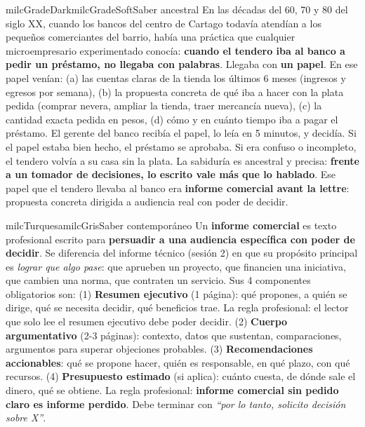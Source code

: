 \documentclass[11pt,letterpaper]{article}
\begin{document}
\begin{softbox}{milcGradeDark}{milcGradeSoft}{Saber ancestral}
En las décadas del 60, 70 y 80 del siglo XX, cuando los bancos del centro de Cartago todavía atendían a los pequeños comerciantes del barrio, había una práctica que cualquier microempresario experimentado conocía: \textbf{cuando el tendero iba al banco a pedir un préstamo, no llegaba con palabras}. Llegaba con \textbf{un papel}. En ese papel venían: (a) las cuentas claras de la tienda los últimos 6 meses (ingresos y egresos por semana), (b) la propuesta concreta de qué iba a hacer con la plata pedida (comprar nevera, ampliar la tienda, traer mercancía nueva), (c) la cantidad exacta pedida en pesos, (d) cómo y en cuánto tiempo iba a pagar el préstamo. El gerente del banco recibía el papel, lo leía en 5 minutos, y decidía. Si el papel estaba bien hecho, el préstamo se aprobaba. Si era confuso o incompleto, el tendero volvía a su casa sin la plata. La sabiduría es ancestral y precisa: \textbf{frente a un tomador de decisiones, lo escrito vale más que lo hablado}. Ese papel que el tendero llevaba al banco era \textbf{informe comercial avant la lettre}: propuesta concreta dirigida a audiencia real con poder de decidir.
\end{softbox}

\begin{softbox}{milcTurquesa}{milcGris}{Saber contemporáneo}
Un \textbf{informe comercial} es texto profesional escrito para \textbf{persuadir a una audiencia específica con poder de decidir}. Se diferencia del informe técnico (sesión 2) en que su propósito principal es \emph{lograr que algo pase}: que aprueben un proyecto, que financien una iniciativa, que cambien una norma, que contraten un servicio. Sus 4 componentes obligatorios son: (1) \textbf{Resumen ejecutivo} (1 página): qué propones, a quién se dirige, qué se necesita decidir, qué beneficios trae. La regla profesional: el lector que solo lee el resumen ejecutivo debe poder decidir. (2) \textbf{Cuerpo argumentativo} (2-3 páginas): contexto, datos que sustentan, comparaciones, argumentos para superar objeciones probables. (3) \textbf{Recomendaciones accionables}: qué se propone hacer, quién es responsable, en qué plazo, con qué recursos. (4) \textbf{Presupuesto estimado} (si aplica): cuánto cuesta, de dónde sale el dinero, qué se obtiene. La regla profesional: \textbf{informe comercial sin pedido claro es informe perdido}. Debe terminar con \emph{``por lo tanto, solicito decisión sobre X''}.
\end{softbox}
\end{document}
